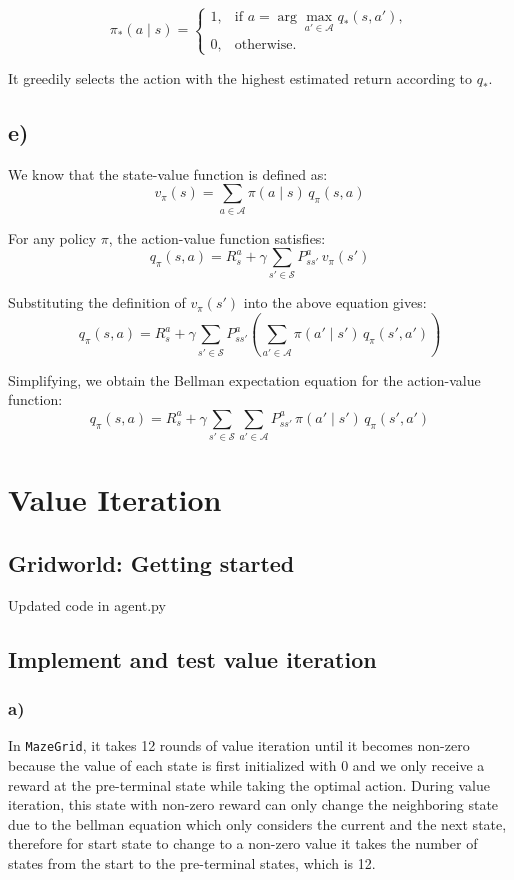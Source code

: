 \documentclass[11pt]{article}
\begin{document}
\[
\pi_{*}(a \mid s) =
\begin{cases}
1, & \text{if } a = \arg\max\limits_{a' \in \mathcal{A}} q_{*}(s,a'), \\[6pt]
0, & \text{otherwise.}
\end{cases}
\]

\noindent
It greedily selects the action with the highest estimated return according to $q_{*}$.

\subsection*{e)}

We know that the state-value function is defined as:
\[
v_{\pi}(s) = \sum_{a \in \mathcal{A}} \pi(a \mid s) \, q_{\pi}(s,a)
\]

For any policy $\pi$, the action-value function satisfies:
\[
q_{\pi}(s,a)
= R_s^a + \gamma \sum_{s' \in \mathcal{S}} P_{ss'}^a \, v_{\pi}(s')
\]

Substituting the definition of $v_{\pi}(s')$ into the above equation gives:
\[
q_{\pi}(s,a)
= R_s^a + \gamma \sum_{s' \in \mathcal{S}} P_{ss'}^a 
   \left( \sum_{a' \in \mathcal{A}} \pi(a' \mid s') \, q_{\pi}(s',a') \right)
\]

Simplifying, we obtain the Bellman expectation equation for the action-value function:
\[
\boxed{
q_{\pi}(s,a)
= R_s^a + \gamma \sum_{s' \in \mathcal{S}} \sum_{a' \in \mathcal{A}} 
      P_{ss'}^a \, \pi(a' \mid s') \, q_{\pi}(s',a')
}
\]

\section{Value Iteration}
\subsection{Gridworld: Getting started}

Updated code in agent.py

\subsection{Implement and test value iteration}
\subsubsection*{a)} In \texttt{MazeGrid}, it takes 12 rounds of value iteration until it becomes non-zero because the value of each state is first initialized with 0 and we only receive a reward at the pre-terminal state while taking the optimal action. During value iteration, this state with non-zero reward can only change the neighboring state due to the bellman equation which only considers the current and the next state, therefore for start state to change to a non-zero value it takes the number of states from the start to the pre-terminal states, which is 12.
\end{document}
